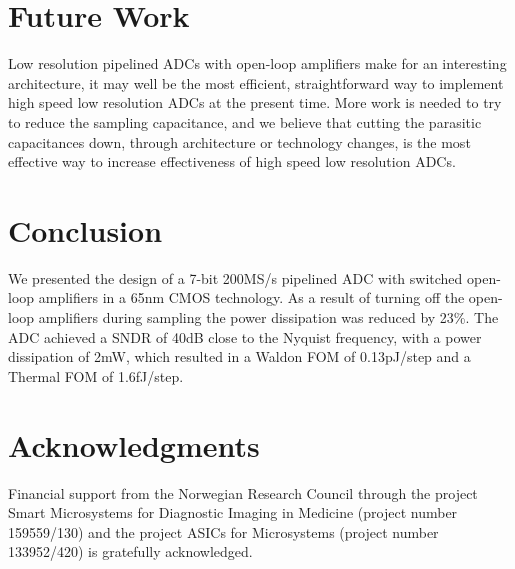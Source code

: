 \section{Future Work}
Low resolution pipelined ADCs with open-loop amplifiers make for an
interesting architecture, it may well be the most efficient, straightforward way
to implement high speed low resolution ADCs at the present time. 
More work is needed to try to reduce the sampling capacitance,
and we believe that cutting the parasitic capacitances down, through
architecture or technology changes, is the most effective way
to increase effectiveness of high speed low resolution ADCs.


\section{Conclusion}
We presented the design of a
7-bit 200MS/s pipelined ADC with switched open-loop amplifiers in a
65nm CMOS technology. As a
result of turning
off the open-loop amplifiers during sampling the power dissipation was
reduced by 23\%. The ADC achieved a SNDR
of 40dB close to the Nyquist frequency, with a power dissipation of
2mW, which resulted in a 
Waldon FOM of 0.13pJ/step and a Thermal FOM of 1.6fJ/step.


\section*{Acknowledgments}
Financial support from the Norwegian Research Council through the
project Smart Microsystems for Diagnostic Imaging in Medicine (project
number 159559/130) and the project ASICs for Microsystems (project
number 133952/420) is gratefully acknowledged.



%


%
